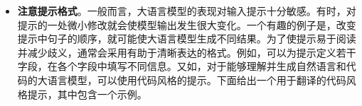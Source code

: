 \begin{itemize}
\begin{tcolorbox}
    \vspace{0.5em}

    上下文信息：$\{*\mathrm{IR\textrm{-}result}*\}$

    \vspace{0.3em}

    问题：$\{*\mathrm{query}*\}$

    \vspace{0.3em}

    \underline{\hspace{2em}}

    \endgroup

    \end{tcolorbox}
    \vspace{0.5em}

    如果上下文信息高度可靠，甚至可以限制大语言模型仅使用所提供的文本作答。示例提示如下：

    \vspace{0.5em}
    \begin{tcolorbox}

    \begingroup
    \setlength{\leftskip}{2em}
    \setlength{\rightskip}{2em}

    你是一位负责回答输入问题的专家。现在给出一个问题及其相应上下文信息。上下文信息组织为一张表，每行代表一条有用的记录。请仅使用这些上下文信息生成答案，并确保用自己的语言作答。

    \vspace{0.5em}

    上下文信息：$\{*\mathrm{table}*\}$

    \vspace{0.3em}

    问题：$\{*\mathrm{query}*\}$

    \vspace{0.3em}

    \underline{\hspace{2em}}

    \endgroup

    \end{tcolorbox}
    \vspace{0.5em}

    处理现实问题时，我们往往拥有有关问题的先验知识和补充信息，这些信息有助于生成更好的答案。在提示中考虑这些信息，通常有助于改善结果。

\item \vspace{0.3em} \textbf{注意提示格式}。一般而言，大语言模型的表现对输入提示十分敏感。有时，对提示的一处微小修改就会使模型输出发生很大变化。一个有趣的例子是，改变提示中句子的顺序，就可能使大语言模型生成不同结果。为了使提示易于阅读并减少歧义，通常会采用有助于清晰表达的格式。例如，可以为提示定义若干字段，在各个字段中填写不同信息。又如，对于能够理解并生成自然语言和代码的大语言模型，可以使用代码风格的提示。下面给出一个用于翻译的代码风格提示，其中包含一个示例。


\end{itemize}
